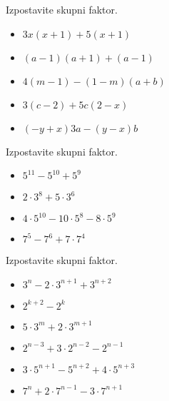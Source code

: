             \begin{naloga}
                Izpostavite skupni faktor.
                \begin{itemize}
                    \item $3x(x+1)+5(x+1)$ 
                    \item $(a-1)(a+1)+(a-1)$ 
                    \item $4(m-1)-(1-m)(a+b)$ 
                    \item $3(c-2)+5c(2-x)$ 
                    \item $(-y+x)3a-(y-x)b$ 
                \end{itemize}
            \end{naloga}
        
    
        
            \begin{naloga}
                Izpostavite skupni faktor.
                \begin{itemize}
                    \item $5^{11}-5^{10}+5^9$ 
                    \item $2\cdot 3^8+5\cdot 3^6$ 
                    \item $4\cdot 5^{10}-10\cdot 5^8-8\cdot 5^9$ 
                    \item $7^5-7^6+7\cdot 7^4$ 
                \end{itemize}
            \end{naloga}
        
    
        
            \begin{naloga}
                Izpostavite skupni faktor.
                \begin{itemize}
                    \item $3^n-2\cdot 3^{n+1}+3^{n+2}$ 
                    \item $2^{k+2}-2^k$ 
                    \item $5\cdot 3^m+2\cdot 3^{m+1}$ 
                    \item $2^{n-3}+3\cdot 2^{n-2}-2^{n-1}$ 
                    \item $3\cdot 5^{n+1}-5^{n+2}+4\cdot 5^{n+3}$ 
                    \item $7^n+2\cdot 7^{n-1}-3\cdot 7^{n+1}$ 
                \end{itemize}
            \end{naloga}
        
    
        
